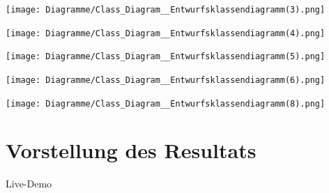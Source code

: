 \documentclass{beamer}
\begin{document}
		\begin{frame}
			\begin{center}
				\texttt{[image: Diagramme/Class\_Diagram\_\_Entwurfsklassendiagramm(3).png]}
			\end{center}
		\end{frame}
		\begin{frame}
			\begin{center}
				\texttt{[image: Diagramme/Class\_Diagram\_\_Entwurfsklassendiagramm(4).png]}
			\end{center}
		\end{frame}
		\begin{frame}
			\begin{center}
				\texttt{[image: Diagramme/Class\_Diagram\_\_Entwurfsklassendiagramm(5).png]}
			\end{center}
		\end{frame}
		\begin{frame}
			\begin{center}
				\texttt{[image: Diagramme/Class\_Diagram\_\_Entwurfsklassendiagramm(6).png]}
			\end{center}
		\end{frame}
		\begin{frame}
			\begin{center}
				\texttt{[image: Diagramme/Class\_Diagram\_\_Entwurfsklassendiagramm(8).png]}
			\end{center}
		\end{frame}
	\section{Vorstellung des Resultats}
		\begin{frame}
			\begin{center}
				Live-Demo
			\end{center}
		\end{frame}
\end{document}
